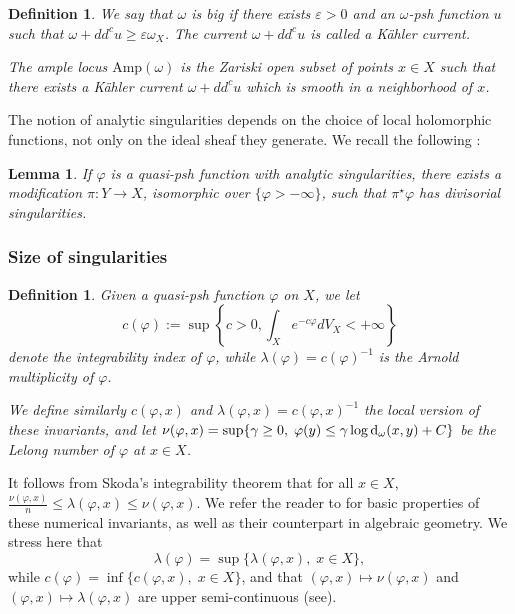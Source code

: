 \documentclass[11pt]{amsart}
\numberwithin{equation}{section}
\newtheorem{lem}[theorem]{Lemma}
\newtheorem{defi}[theorem]{Definition}
\newcommand{\f}{\varphi}
\newcommand \la {\lambda}
\begin{document}
\begin{defi}\label{defi:big-ample locus} 
We say that $\omega$ is \emph{big} if there exists $\varepsilon>0$ and
an $\omega$-psh function $u$ such that $\omega+dd^c u \geq \varepsilon \omega_X$.
The current $\omega+dd^c u$ is called a \emph{K\"ahler current}.

The \emph{ample locus} $\mathrm{Amp}(\omega)$  is the Zariski open subset 
of points $x\in X$ such that there exists a K\"ahler current 
$\omega+dd^c u$
which is smooth in a neighborhood of $x$. 
\end{defi}

The notion of analytic singularities  depends on the choice of local holomorphic functions, 
not only on the ideal sheaf they generate.
We recall the following \cite[Lemma 1.7]{BGL25}:

\begin{lem}\label{lem:analres} 
If $\f$ is a quasi-psh function with analytic singularities, there exists a modification $\pi\colon Y\to X$, isomorphic over 
 $\{\f>-\infty\}$, such that $\pi^\star\f$ has divisorial singularities. 
\end{lem}











\subsubsection*{Size of singularities}


\begin{defi}
Given a quasi-psh function $\f$ on $X$, we let 
$$
c(\f):=\sup \left\{c>0, \int_X e^{-c\f} dV_X <+\infty \right\}
$$
denote the integrability index of $\f$, while $\la(\f)=c(\f)^{-1}$ is the Arnold multiplicity of $\f$.

We define similarly $c(\f,x)$ and $\la(\f,x)=c(\f,x)^{-1}$ the local version of these invariants,
and let $\nu(\f,x)=\sup \{ \gamma \geq 0, \; \f(y) \leq \gamma \log {\rm d}_{\omega}(x,y)+C \}$
be the Lelong number of $\f$ at $x \in X$.
\end{defi}



It follows from Skoda's integrability theorem \cite[Theorem 2.50]{GZbook} that for all $x \in X$,
$
\frac{\nu(\f,x)}{n} \leq \la(\f,x) \leq \nu(\f,x).
$
We refer the reader to \cite{DK01,GZbook} for basic properties of these numerical invariants, 
as well as their counterpart in algebraic geometry. We  stress here that
$$
\la(\f)=\sup \{ \la(\f,x), \; x \in X \},
$$
while $c(\f)=\inf \{ c(\f,x), \; x \in X \}$,
and that $(\f,x) \mapsto \nu(\f,x)$  
and $(\f,x) \mapsto \la(\f,x)$ are upper semi-continuous (see\cite[Main theorem]{DK01}).
\end{document}
